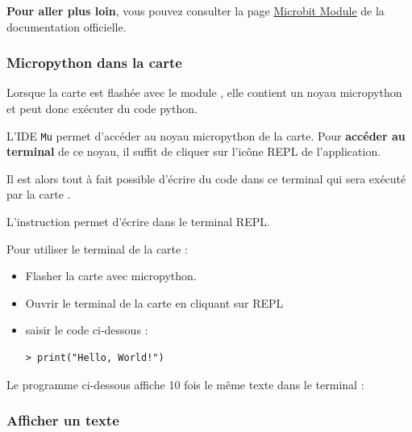 \begin{remarque}
\textbf{Pour aller plus loin}, vous pouvez consulter la page  \href{https://microbit-micropython.readthedocs.io/fr/latest/microbit.html}{Microbit Module} de la documentation officielle.
\end{remarque}


\subsubsection{Micropython dans la carte \mb}

Lorsque la carte \mb est flashée avec le module , elle contient un noyau micropython et peut donc exécuter du code python.

L'IDE \texttt{Mu} permet d'accéder au noyau micropython de la carte. Pour \textbf{accéder au terminal} de ce noyau, il suffit de cliquer sur l'icône REPL de l'application.

Il est alors tout à fait possible d'écrire du code dans ce terminal qui sera exécuté par la carte \mb.

\begin{remarque}
    L'instruction  permet d'écrire dans le terminal REPL.
\end{remarque}

\begin{methode}
Pour utiliser le terminal de la carte \mb :
\begin{itemize}
    \item Flasher la carte \mb avec micropython.
    \item Ouvrir le terminal de la carte en cliquant sur REPL
    \item saisir le code ci-dessous :\\
\begin{verbatim}
> print("Hello, World!")
\end{verbatim}
\end{itemize}
\end{methode}

\begin{methode}
    Le programme ci-dessous affiche 10 fois le même texte dans le terminal :
\end{methode}


\subsubsection{Afficher un texte}

